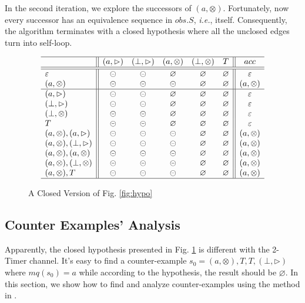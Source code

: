\documentclass[conference, a4paper]{IEEEtran}
\newcommand{\rblock}[0]{\circleddash}
\newcommand{\rread}[0]{\rhd}
\newcommand{\rnoread}[0]{\otimes}
\newcommand{\rempty}[0]{\varnothing}
\begin{document}
In the second iteration, we explore the successors of $(a,\rnoread)$. Fortunately, now every
successor has an equivalence sequence in $obs.S$, \emph{i.e.}, itself. Consequently, the algorithm terminates
with a closed hypothesis where all the unclosed edges turn into
self-loop.

\begin{figure}[ht]
  \begin{center}
    \begin{displaymath}
      \begin{array}{l||ccccc||c}
        \hline
        & (a,\rread) & (\bot,\rread) & (a,\rnoread) & (\bot,\rnoread) & T & acc\\
        \hline\hline
        \varepsilon & \rblock & \rblock & \rempty & \rempty & \rempty & \varepsilon \\
        (a,\rnoread) & \rblock & \rblock & \rblock & \rempty & \rempty & (a,\rnoread) \\
        \hline
        (a,\rread) & \rblock & \rblock & \rempty & \rempty & \rempty & \varepsilon\\
        (\bot,\rread) & \rblock & \rblock & \rempty & \rempty & \rempty & \varepsilon \\
        (\bot,\rnoread) & \rblock & \rblock & \rempty & \rempty & \rempty & \varepsilon \\
        T & \rblock & \rblock & \rempty & \rempty & \rempty & \varepsilon \\
        (a,\rnoread),(a,\rread) & \rblock & \rblock & \rblock & \rempty & \rempty & (a,\rnoread) \\
        (a,\rnoread),(\bot,\rread) & \rblock & \rblock & \rblock & \rempty & \rempty & (a,\rnoread) \\
        (a,\rnoread),(a,\rnoread) & \rblock & \rblock & \rblock & \rempty & \rempty & (a,\rnoread) \\
        (a,\rnoread),(\bot,\rnoread) & \rblock & \rblock & \rblock & \rempty & \rempty &
        (a,\rnoread) \\
        (a,\rnoread),T & \rblock & \rblock & \rblock & \rempty & \rempty & (a,\rnoread) \\
        \hline
      \end{array}
    \end{displaymath}
  \end{center}
  \caption{A Closed Version of Fig. \ref{fig:hypo}}
  \label{fig:hypo2}
\end{figure}

\subsection{Counter Examples' Analysis} 
Apparently, the closed hypothesis presented in Fig. \ref{fig:hypo2} is different with the 2-Timer
channel. It's easy to find a counter-example $s_0=(a,\rnoread),T,T,(\bot,\rread)$ where $mq(s_0)=a$ while
according to the hypothesis, the result should be $\rempty$. In this section, we show how to
find and analyze counter-examples using the method in \cite{DBLP:conf/sfm/SteffenHM11}. 
\end{document}
